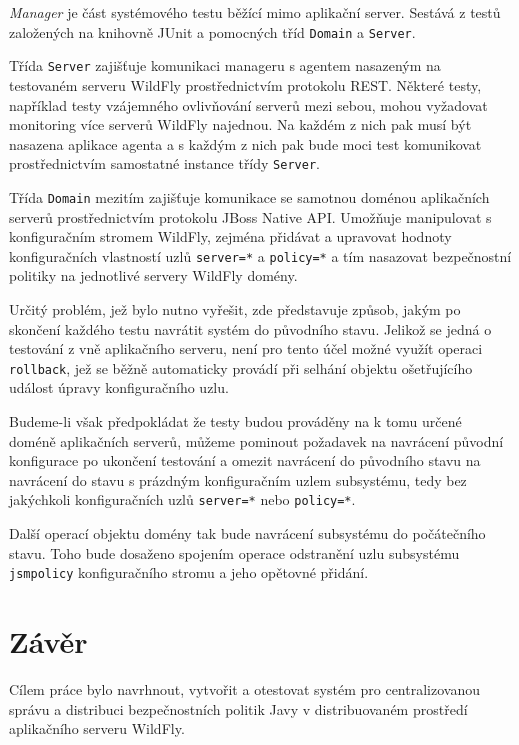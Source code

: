 {\it Manager} je část systémového testu běžící mimo aplikační server. Sestává z testů založených na knihovně JUnit a pomocných tříd {\tt Domain} a {\tt Server}.

Třída {\tt Server} zajišťuje komunikaci manageru s agentem nasazeným na testovaném serveru WildFly prostřednictvím protokolu REST. Některé testy, například testy vzájemného ovlivňování serverů mezi sebou, mohou vyžadovat monitoring více serverů WildFly najednou. Na každém z nich pak musí být nasazena aplikace agenta a s každým z nich pak bude moci test komunikovat prostřednictvím samostatné instance třídy {\tt Server}.

Třída {\tt Domain} mezitím zajišťuje komunikace se samotnou doménou aplikačních serverů prostřednictvím protokolu JBoss Native API. Umožňuje manipulovat s konfiguračním stromem WildFly, zejména přidávat a upravovat hodnoty konfiguračních vlastností uzlů {\tt server=*} a {\tt policy=*} a tím nasazovat bezpečnostní politiky na jednotlivé servery WildFly domény.

Určitý problém, jež bylo nutno vyřešit, zde představuje způsob, jakým po skončení každého testu navrátit systém do původního stavu. Jelikož se jedná o testování z vně aplikačního serveru, není pro tento účel možné využít operaci {\tt rollback}, jež se běžně automaticky provádí při selhání objektu ošetřujícího událost úpravy konfiguračního uzlu.

Budeme-li však předpokládat že testy budou prováděny na k tomu určené doméně aplikačních serverů, můžeme pominout požadavek na navrácení původní konfigurace po ukončení testování a omezit navrácení do původního stavu na navrácení do stavu s prázdným konfiguračním uzlem subsystému, tedy bez jakýchkoli konfiguračních uzlů 
{\tt server=*} nebo {\tt policy=*}.

Další operací objektu domény tak bude navrácení subsystému do počátečního stavu. Toho bude dosaženo spojením operace odstranění uzlu subsystému {\tt jsmpolicy} konfiguračního stromu a jeho opětovné přidání.

\chapter{Závěr}

Cílem práce bylo navrhnout, vytvořit a otestovat systém pro centralizovanou správu a distribuci bezpečnostních politik Javy v distribuovaném prostředí aplikačního serveru WildFly.

